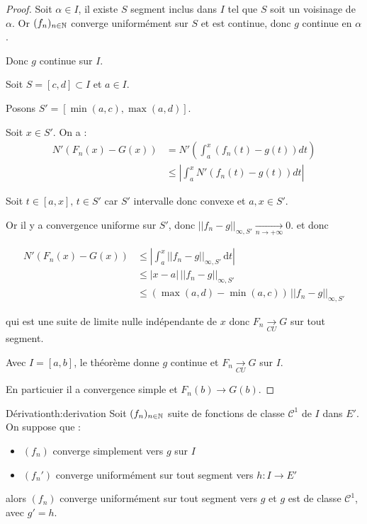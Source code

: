 \begin{proof}
    Soit $\alpha \in I$, il existe $S$ segment inclus dans $I$ tel que $S$ soit un voisinage de $\alpha$. Or 
    $(f_n)_{n \in \mathbb{N}}$ converge uniformément sur $S$ et est continue, donc $g$ continue en $\alpha$. 

    Donc $g$ continue sur $I$.

    \lvspace Soit $S = [c, d] \subset I$ et $a \in I$. 
    
    Posons $S' = [\min(a, c), \max(a, d)]$.

    Soit $x \in S'$. On a :
    \begin{align}
        N'(F_n(x) - G(x)) & = N'\left( \int_a^x (f_n(t) - g(t)) dt \right) \\
        & \leqslant \left| \int_{a}^x N'(f_n(t) - g(t)) dt \right|
    \end{align}

    Soit $t \in [a, x], \, t \in S'$ car $S'$ intervalle donc convexe et $a, x \in S'$. 

    Or il y a convergence uniforme sur $S'$, donc $||f_n - g||_{\infty, S'} \xrightarrow[n\to +\infty]{} 0$.
    et donc 

    \begin{equation*}
    \begin{aligned}
        N'(F_n(x) - G(x)) & \leqslant \left| \int_{a}^{x} ||f_n - g||_{\infty, S'} \,\mathrm{d}t \right| \\
        & \leqslant |x - a| \, ||f_n - g||_{\infty, S'} \\
        & \leqslant (\max(a, d) - \min(a, c)) \, ||f_n - g||_{\infty, S'}
    \end{aligned}
    \end{equation*}

    qui est une suite de limite nulle indépendante de $x$ donc $F_n \xrightarrow[CU]{} G$ sur tout segment. 


    \avspace Avec $I = [a, b]$, le théorème donne $g$ continue et $F_n \xrightarrow[CU]{} G$ sur $I$. 

    En particuier il a convergence simple et $F_n(b) \to G(b)$.
\end{proof}

\begin{theoreme}{Dérivation}{th:derivation}
    Soit $(f_n)_{n \in \mathbb{N}}$ suite de fonctions de classe $\mathscr{C}^1$ de $I$ dans $E'$.
    On suppose que : 
    \begin{itemize}
        \item $(f_n)$ converge simplement vers $g$ sur $I$
        \item $(f_n')$ converge uniformément sur tout segment vers $h : I \to E'$
    \end{itemize}

    alors $(f_n)$ converge uniformément sur tout segment vers $g$ et $g$ est de classe $\mathscr{C}^1$, 
    avec $g' = h$.
\end{theoreme}

